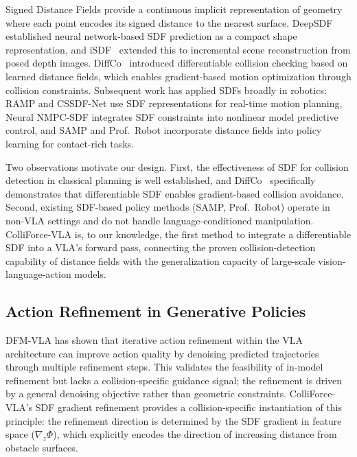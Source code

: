 Signed Distance Fields provide a continuous implicit representation of geometry where each point encodes its signed distance to the nearest surface. DeepSDF~\cite{park2019deepsdf} established neural network-based SDF prediction as a compact shape representation, and iSDF~\cite{ortiz2022isdf} extended this to incremental scene reconstruction from posed depth images. DiffCo~\cite{zhi2021diffco} introduced differentiable collision checking based on learned distance fields, which enables gradient-based motion optimization through collision constraints. Subsequent work has applied SDFs broadly in robotics: RAMP and CSSDF-Net use SDF representations for real-time motion planning, Neural NMPC-SDF integrates SDF constraints into nonlinear model predictive control, and SAMP and Prof.\ Robot incorporate distance fields into policy learning for contact-rich tasks.

Two observations motivate our design. First, the effectiveness of SDF for collision detection in classical planning is well established, and DiffCo~\cite{zhi2021diffco} specifically demonstrates that differentiable SDF enables gradient-based collision avoidance. Second, existing SDF-based policy methods (SAMP, Prof.\ Robot) operate in non-VLA settings and do not handle language-conditioned manipulation. ColliForce-VLA is, to our knowledge, the first method to integrate a differentiable SDF into a VLA's forward pass, connecting the proven collision-detection capability of distance fields with the generalization capacity of large-scale vision-language-action models.

\subsection{Action Refinement in Generative Policies}

DFM-VLA has shown that iterative action refinement within the VLA architecture can improve action quality by denoising predicted trajectories through multiple refinement steps. This validates the feasibility of in-model refinement but lacks a collision-specific guidance signal; the refinement is driven by a general denoising objective rather than geometric constraints. ColliForce-VLA's SDF gradient refinement provides a collision-specific instantiation of this principle: the refinement direction is determined by the SDF gradient in feature space ($\nabla_z \Phi$), which explicitly encodes the direction of increasing distance from obstacle surfaces.
